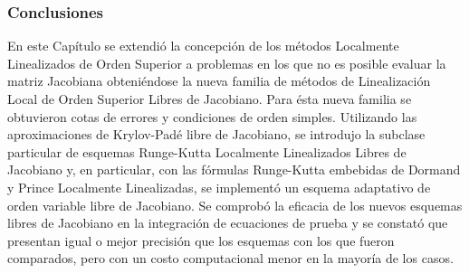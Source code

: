 \vspace{2cm}

\subsubsection{Conclusiones}
En este Capítulo se extendió la concepción de los métodos Localmente Linealizados de Orden Superior a problemas en los que no es posible evaluar la matriz Jacobiana obteniéndose la nueva familia de métodos de Linealización Local de Orden Superior Libres de Jacobiano. Para ésta nueva familia se obtuvieron cotas de errores y condiciones de orden simples. Utilizando las aproximaciones de Krylov-Padé libre de Jacobiano, se introdujo la subclase particular de esquemas Runge-Kutta Localmente Linealizados
Libres de Jacobiano y, en particular, con las fórmulas Runge-Kutta embebidas de Dormand y Prince Localmente Linealizadas, se implementó un esquema adaptativo de orden variable libre de Jacobiano. Se comprobó la eficacia de los nuevos esquemas libres de Jacobiano en la integración de
ecuaciones de prueba y se constató que presentan igual o mejor precisión que los esquemas con los que fueron comparados, pero con un costo computacional menor en la mayoría de los casos.

%
